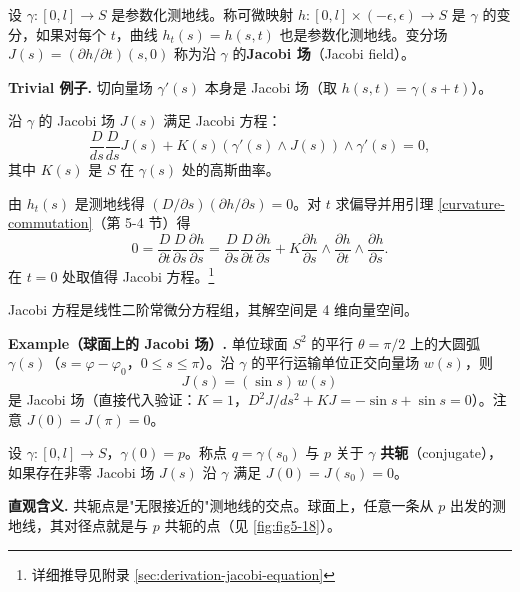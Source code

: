 \begin{Definition}[Jacobi 场]\label{def:jacobi-field}
设 $\gamma: [0,l] \to S$ 是参数化测地线。称可微映射 $h: [0,l]\times(-\epsilon,\epsilon) \to S$ 是 $\gamma$ 的变分，如果对每个 $t$，曲线 $h_t(s) = h(s,t)$ 也是参数化测地线。变分场 $J(s) = (\partial h/\partial t)(s,0)$ 称为沿 $\gamma$ 的\textbf{Jacobi 场}（Jacobi field）。
\end{Definition}

\textbf{Trivial 例子.} 切向量场 $\gamma'(s)$ 本身是 Jacobi 场（取 $h(s,t) = \gamma(s+t)$）。

\begin{Proposition}\label{prop:jacobi-equation}
沿 $\gamma$ 的 Jacobi 场 $J(s)$ 满足 Jacobi 方程：
\[
\frac{D}{ds}\frac{D}{ds}J(s) + K(s)(\gamma'(s)\wedge J(s))\wedge\gamma'(s) = 0,
\]
其中 $K(s)$ 是 $S$ 在 $\gamma(s)$ 处的高斯曲率。
\end{Proposition}

\begin{Proof}
由 $h_t(s)$ 是测地线得 $(D/\partial s)(\partial h/\partial s) = 0$。对 $t$ 求偏导并用引理 \ref{curvature-commutation}（第 5-4 节）得
\[
0 = \frac{D}{\partial t}\frac{D}{\partial s}\frac{\partial h}{\partial s} = \frac{D}{\partial s}\frac{D}{\partial t}\frac{\partial h}{\partial s} + K\frac{\partial h}{\partial s}\wedge\frac{\partial h}{\partial t}\wedge\frac{\partial h}{\partial s}.
\]
在 $t=0$ 处取值得 Jacobi 方程。\footnote{详细推导见附录 \cref{sec:derivation-jacobi-equation}}
\end{Proof}

\begin{Remark}
Jacobi 方程是线性二阶常微分方程组，其解空间是 4 维向量空间。
\end{Remark}

\textbf{Example（球面上的 Jacobi 场）.} 单位球面 $S^2$ 的平行 $\theta=\pi/2$ 上的大圆弧 $\gamma(s)$（$s=\varphi-\varphi_0$，$0\leq s\leq\pi$）。沿 $\gamma$ 的平行运输单位正交向量场 $w(s)$，则
\[
J(s) = (\sin s)\,w(s)
\]
是 Jacobi 场（直接代入验证：$K=1$，$D^2J/ds^2 + KJ = -\sin s + \sin s = 0$）。注意 $J(0)=J(\pi)=0$。

\begin{Definition}[共轭点]\label{def:conjugate-point}
设 $\gamma: [0,l] \to S$，$\gamma(0)=p$。称点 $q=\gamma(s_0)$ 与 $p$ 关于 $\gamma$ \textbf{共轭}（conjugate），如果存在非零 Jacobi 场 $J(s)$ 沿 $\gamma$ 满足 $J(0)=J(s_0)=0$。
\end{Definition}

\textbf{直观含义.} 共轭点是"无限接近的"测地线的交点。球面上，任意一条从 $p$ 出发的测地线，其对径点就是与 $p$ 共轭的点（见 \cref{fig:fig5-18}）。

